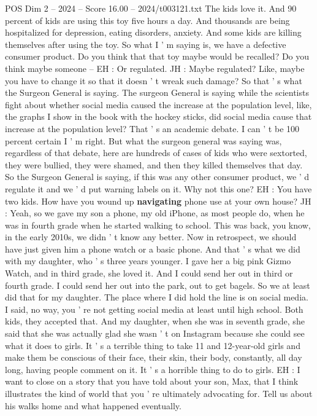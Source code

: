 \begin{textsample}{POS Dim 2 – 2024 – Score 16.00 – 2024/t003121.txt}
The kids love it.
And 90 percent of kids are using this toy five hours a day.
And thousands are being hospitalized for depression, eating disorders, anxiety.
And some kids are killing themselves after using the toy.
So what I ' m saying is, we have a defective consumer product.
Do you think that that toy maybe would be recalled?
Do you think maybe someone -- EH : Or regulated.
JH : Maybe regulated?
Like, maybe you have to change it so that it doesn ' t wreak such damage?
So that ' s what the Surgeon General is saying.
The surgeon General is saying while the scientists fight about whether social media caused the increase at the population level, like, the graphs I show in the book with the hockey sticks, did social media cause that increase at the population level?
That ' s an academic debate.
I can ' t be 100 percent certain I ' m right.
But what the surgeon general was saying was, regardless of that debate, here are hundreds of cases of kids who were sextorted, they were bullied, they were shamed, and then they killed themselves that day.
So the Surgeon General is saying, if this was any other consumer product, we ' d regulate it and we ' d put warning labels on it.
Why not this one?
EH : You have two kids.
How have you wound up \textbf{navigating} phone use at your own house?
JH : Yeah, so we gave my son a phone, my old iPhone, as most people do, when he was in fourth grade when he started walking to school.
This was back, you know, in the early 2010s, we didn ' t know any better.
Now in retrospect, we should have just given him a phone watch or a basic phone.
And that ' s what we did with my daughter, who ' s three years younger.
I gave her a big pink Gizmo Watch, and in third grade, she loved it.
And I could send her out in third or fourth grade.
I could send her out into the park, out to get bagels.
So we at least did that for my daughter.
The place where I did hold the line is on social media.
I said, no way, you ' re not getting social media at least until high school.
Both kids, they accepted that.
And my daughter, when she was in seventh grade, she said that she was actually glad she wasn ' t on Instagram because she could see what it does to girls.
It ' s a terrible thing to take 11 and 12-year-old girls and make them be conscious of their face, their skin, their body, constantly, all day long, having people comment on it.
It ' s a horrible thing to do to girls.
EH : I want to close on a story that you have told about your son, Max, that I think illustrates the kind of world that you ' re ultimately advocating for.
Tell us about his walks home and what happened eventually.

\end{textsample}
